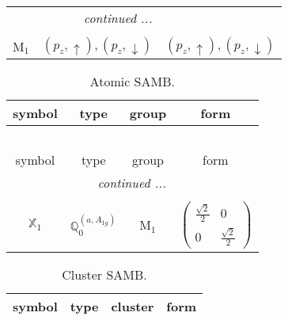 \documentclass[fleqn,10pt,landscape]{article}
\begin{document}
\begin{itemize}
\begin{center}
\begin{longtable}{c|c|c}
 \hline \hline
\multicolumn{2}{r}{\footnotesize\it continued ...} \\ \endfoot

 \hline \hline
\multicolumn{2}{r}{} \\ \endlastfoot

M$_{1}$ & $(p_{z},\uparrow), (p_{z},\downarrow)$ & $(p_{z},\uparrow), (p_{z},\downarrow)$ \\
\end{longtable}
\end{center}
\begin{center}
\renewcommand{\arraystretch}{1.3}
\begin{longtable}{c|c|c|c}
\caption{Atomic SAMB.}
 \\
 \hline \hline
symbol & type & group & form \\ \hline \endfirsthead

\multicolumn{3}{l}{\tablename\ \thetable{}} \\
 \hline \hline
symbol & type & group & form \\ \hline \endhead

 \hline \hline
\multicolumn{3}{r}{\footnotesize\it continued ...} \\ \endfoot

 \hline \hline
\multicolumn{3}{r}{} \\ \endlastfoot

$ \mathbb{X}_{1} $ & $\mathbb{Q}_{0}^{(a,A_{1g})}$ & M$_{1}$ & $\begin{pmatrix} \frac{\sqrt{2}}{2} & 0 \\ 0 & \frac{\sqrt{2}}{2} \end{pmatrix}$ \\
\end{longtable}
\end{center}
\begin{center}
\renewcommand{\arraystretch}{1.3}
\begin{longtable}{c|c|c|c}
\caption{Cluster SAMB.}
 \\
 \hline \hline
symbol & type & cluster & form \\ \hline \endfirsthead


\end{longtable}
\end{center}
\end{itemize}
\end{document}
